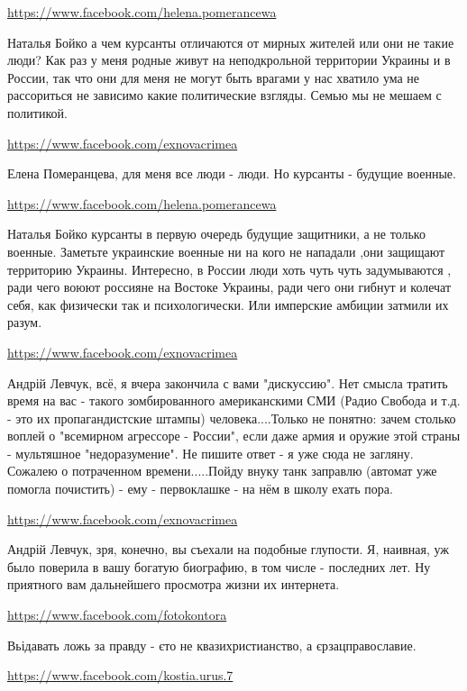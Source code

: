 \documentclass[a4paper,11pt]{extreport}
\begin{document}
\begin{itemize}
\begin{itemize}
\url{https://www.facebook.com/helena.pomerancewa}

Наталья Бойко а чем курсанты отличаются от мирных жителей или они не такие люди?
Как раз у меня родные живут на неподкрольной территории Украины и в России, так что они для меня не могут быть врагами у нас хватило ума не рассориться не зависимо какие политические взгляды. Семью мы не мешаем с политикой.

\url{https://www.facebook.com/exnovacrimea}

Елена Померанцева, для меня все люди - люди. Но курсанты - будущие военные.

\url{https://www.facebook.com/helena.pomerancewa}

Наталья Бойко курсанты в первую очередь будущие защитники, а не только военные.
Заметьте украинские военные ни на кого не нападали ,они защищают территорию Украины.
Интересно, в России люди хоть чуть чуть задумываются , ради чего воюют россияне на Востоке Украины, ради чего они гибнут и колечат себя, как физически так и психологически. Или имперские амбиции затмили их разум.

\url{https://www.facebook.com/exnovacrimea}

Андрій Левчук, всё, я вчера закончила с вами "дискуссию". Нет смысла тратить время на вас - такого зомбированного американскими СМИ (Радио Свобода и т.д. - это их пропагандистские штампы) человека....Только не понятно: зачем столько воплей о "всемирном агрессоре - России", если даже армия и оружие этой страны - мультяшное "недоразумение". Не пишите ответ - я уже сюда не загляну. Сожалею о потраченном времени.....Пойду внуку танк заправлю (автомат уже помогла почистить) - ему - первоклашке - на нём в школу ехать пора.

\url{https://www.facebook.com/exnovacrimea}

Андрій Левчук, зря, конечно, вы съехали на подобные глупости. Я, наивная, уж было поверила в вашу богатую биографию, в том числе - последних лет. Ну приятного вам дальнейшего просмотра жизни их интернета.

\end{itemize}
\url{https://www.facebook.com/fotokontora}

Вьідавать ложь за правду - єто не квазихристианство, а єрзацправославие.

\url{https://www.facebook.com/kostia.urus.7}


\end{itemize}
\end{document}
